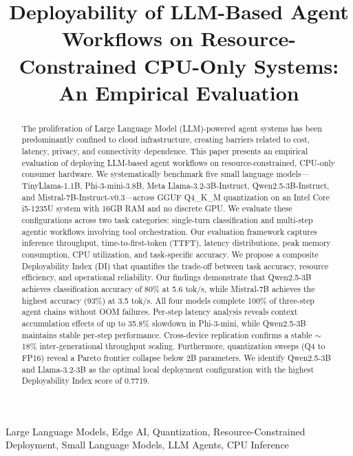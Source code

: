 \documentclass[conference]{IEEEtran}
\begin{document}
\title{Deployability of LLM-Based Agent Workflows on Resource-Constrained CPU-Only Systems: An Empirical Evaluation}

\author{
}

\maketitle

\begin{abstract}
The proliferation of Large Language Model (LLM)-powered agent systems has been predominantly confined to cloud infrastructure, creating barriers related to cost, latency, privacy, and connectivity dependence. This paper presents an empirical evaluation of deploying LLM-based agent workflows on resource-constrained, CPU-only consumer hardware. We systematically benchmark five small language models---TinyLlama-1.1B, Phi-3-mini-3.8B, Meta Llama-3.2-3B-Instruct, Qwen2.5-3B-Instruct, and Mistral-7B-Instruct-v0.3---across GGUF Q4\_K\_M quantization on an Intel Core i5-1235U system with 16GB RAM and no discrete GPU. We evaluate these configurations across two task categories: single-turn classification and multi-step agentic workflows involving tool orchestration. Our evaluation framework captures inference throughput, time-to-first-token (TTFT), latency distributions, peak memory consumption, CPU utilization, and task-specific accuracy. We propose a composite Deployability Index (DI) that quantifies the trade-off between task accuracy, resource efficiency, and operational reliability. Our findings demonstrate that Qwen2.5-3B achieves classification accuracy of 80\% at 5.6 tok/s, while Mistral-7B achieves the highest accuracy (93\%) at 3.5 tok/s. All four models complete 100\% of three-step agent chains without OOM failures. Per-step latency analysis reveals context accumulation effects of up to 35.8\% slowdown in Phi-3-mini, while Qwen2.5-3B maintains stable per-step performance. Cross-device replication confirms a stable $\sim$18\% inter-generational throughput scaling. Furthermore, quantization sweeps (Q4 to FP16) reveal a Pareto frontier collapse below 2B parameters. We identify Qwen2.5-3B and Llama-3.2-3B as the optimal local deployment configuration with the highest Deployability Index score of 0.7719.
\end{abstract}

\begin{IEEEkeywords}
Large Language Models, Edge AI, Quantization, Resource-Constrained Deployment, Small Language Models, LLM Agents, CPU Inference
\end{IEEEkeywords}
\end{document}
